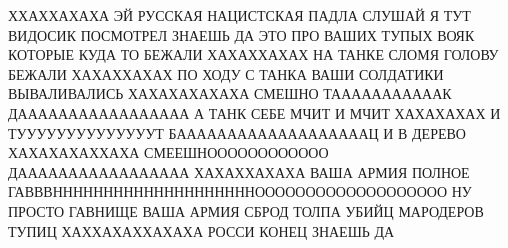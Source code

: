  
 
 
 
 

ХХАХХАХАХА ЭЙ РУССКАЯ НАЦИСТСКАЯ ПАДЛА СЛУШАЙ Я ТУТ ВИДОСИК ПОСМОТРЕЛ ЗНАЕШЬ ДА
ЭТО ПРО ВАШИХ ТУПЫХ ВОЯК КОТОРЫЕ КУДА ТО БЕЖАЛИ ХАХАХХАХАХ НА ТАНКЕ СЛОМЯ
ГОЛОВУ БЕЖАЛИ ХАХАХХАХАХ ПО ХОДУ С ТАНКА ВАШИ СОЛДАТИКИ ВЫВАЛИВАЛИСЬ
ХАХАХАХАХАХА СМЕШНО ТАААААААААААК ДААААААААААААААААА А ТАНК СЕБЕ МЧИТ И МЧИТ
ХАХАХАХАХ И ТУУУУУУУУУУУУУУТ БАААААААААААААААААААЦ И В ДЕРЕВО ХАХАХАХАХХАХА
СМЕЕШНОООООООООООО ДААААААААААААААААА ХАХАХХАХАХА ВАША АРМИЯ ПОЛНОЕ
ГАВВВННННННННННННННННННННООООООООООООООООООО НУ ПРОСТО ГАВНИЩЕ ВАША АРМИЯ СБРОД
ТОЛПА УБИЙЦ МАРОДЕРОВ ТУПИЦ ХАХХАХАХХАХАХА РОССИ КОНЕЦ ЗНАЕШЬ ДА

